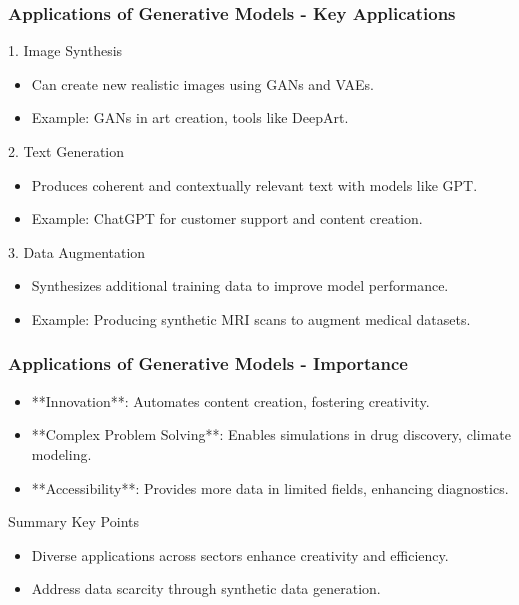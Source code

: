 \documentclass[aspectratio=169]{beamer}
\begin{document}
\begin{frame}[fragile]
    \frametitle{Applications of Generative Models - Key Applications}
    \begin{block}{1. Image Synthesis}
        \begin{itemize}
            \item Can create new realistic images using GANs and VAEs. 
            \item Example: GANs in art creation, tools like DeepArt.
        \end{itemize}
    \end{block}

    \begin{block}{2. Text Generation}
        \begin{itemize}
            \item Produces coherent and contextually relevant text with models like GPT.
            \item Example: ChatGPT for customer support and content creation.
        \end{itemize}
    \end{block}

    \begin{block}{3. Data Augmentation}
        \begin{itemize}
            \item Synthesizes additional training data to improve model performance.
            \item Example: Producing synthetic MRI scans to augment medical datasets.
        \end{itemize}
    \end{block}
\end{frame}

\begin{frame}[fragile]
    \frametitle{Applications of Generative Models - Importance}
    \begin{itemize}
        \item **Innovation**: Automates content creation, fostering creativity.
        \item **Complex Problem Solving**: Enables simulations in drug discovery, climate modeling.
        \item **Accessibility**: Provides more data in limited fields, enhancing diagnostics.
    \end{itemize}

    \begin{block}{Summary Key Points}
        \begin{itemize}
            \item Diverse applications across sectors enhance creativity and efficiency.
            \item Address data scarcity through synthetic data generation.
        \end{itemize}
    \end{block}
\end{frame}
\end{document}
